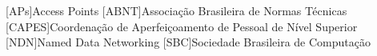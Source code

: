 \begin{acronym}[ACRONYM] 
[APs]{Access Points}
[ABNT]{Associação Brasileira de Normas Técnicas}
[CAPES]{Coordenação de Aperfeiçoamento de Pessoal de Nível Superior}
[NDN]{Named Data Networking}
[SBC]{Sociedade Brasileira de Computação}
\end{acronym}
